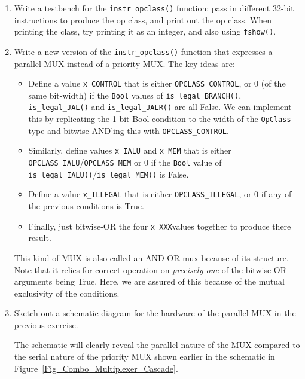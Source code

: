 \begin{enumerate}

\item Write a testbench for the \verb|instr_opclass()| function: pass
  in different 32-bit instructions to produce the op class, and print
  out the op class.  When printing the class, try printing it as an
  integer, and also using \verb|fshow()|.

\item Write a new version of the \verb|instr_opclass()| function that
  expresses a parallel MUX instead of a priority MUX.  The key ideas
  are:

  \begin{itemize}

    \item Define a value \verb|x_CONTROL| that is either
      \verb|OPCLASS_CONTROL|, or 0 (of the same bit-width) if the
      \verb|Bool| values of \verb|is_legal_BRANCH()|,
      \verb|is_legal_JAL()| and \verb|is_legal_JALR()| are all False.
      We can implement this by replicating the 1-bit Bool condition to
      the width of the \verb|OpClass| type and bitwise-AND'ing this
      with \verb|OPCLASS_CONTROL|.

    \item Similarly, define values \verb|x_IALU| and \verb|x_MEM| that
       is either \verb|OPCLASS_IALU|/\verb|OPCLASS_MEM| or 0 if the
       \verb|Bool| value of
       \verb|is_legal_IALU()|/\verb|is_legal_MEM()| is False.

    \item Define a value \verb|x_ILLEGAL| that is either
      \verb|OPCLASS_ILLEGAL|, or 0 if any of
      the previous conditions is True.

    \item Finally, just bitwise-OR the four \verb|x_XXX|values
      together to produce there result.

  \end{itemize}

  This kind of MUX is also called an AND-OR mux because of its
  structure.  Note that it relies for correct operation on
  \emph{precisely one} of the bitwise-OR arguments being True.  Here,
  we are assured of this because of the mutual exclusivity of the
  conditions.

\item Sketch out a schematic diagram for the hardware of the parallel
  MUX in the previous exercise.

  The schematic will clearly reveal the parallel nature of the MUX
  compared to the serial nature of the priority MUX shown earlier in
  the schematic in Figure~\ref{Fig_Combo_Multiplexer_Cascade}.


\end{enumerate}
